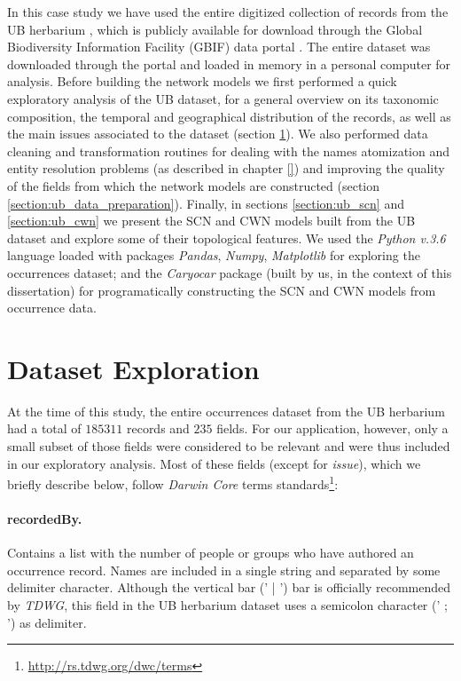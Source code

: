 In this case study we have used the entire digitized collection of records from the UB herbarium \cite{gbif_ubdataset}, which is publicly available for download through the Global Biodiversity Information Facility (GBIF) data portal \cite{gbif}. 
The entire dataset was downloaded through the portal and loaded in memory in a personal computer for analysis.
%
Before building the network models we first performed a quick exploratory analysis of the UB dataset, for a general overview on its taxonomic composition, the temporal and geographical distribution of the records, as well as the main issues associated to the dataset (section \ref{section:ub_exploration}).
We also performed data cleaning and transformation routines for dealing with the names atomization and entity resolution problems (as described in chapter \ref{}) and improving the quality of the fields from which the network models are constructed (section \ref{section:ub_data_preparation}).
Finally, in sections \ref{section:ub_scn} and \ref{section:ub_cwn} we present the SCN and CWN models built from the UB dataset and explore some of their topological features. 
%
We used the \textit{Python v.3.6} language loaded with packages \textit{Pandas}, \textit{Numpy}, \textit{Matplotlib} for exploring the occurrences dataset; and the \textit{Caryocar} package (built by us, in the context of this dissertation) for programatically constructing the SCN and CWN models from occurrence data.





\section{Dataset Exploration}\label{section:ub_exploration}

At the time of this study, the entire occurrences dataset from the UB herbarium had a total of $185311$ records and $235$ fields.
For our application, however, only a small subset of those fields were considered to be relevant and were thus included in our exploratory analysis.
Most of these fields (except for \textit{issue}), which we briefly describe below, follow \textit{Darwin Core} terms standards\footnote{\url{http://rs.tdwg.org/dwc/terms}}:

\paragraph*{recordedBy.} Contains a list with the number of people or groups who have authored an occurrence record. 
Names are included in a single string and separated by some delimiter character. 
Although the vertical bar (' | ') bar is officially recommended by \textit{TDWG}, this field in the UB herbarium dataset uses a semicolon character (' ; ') as delimiter.
%
